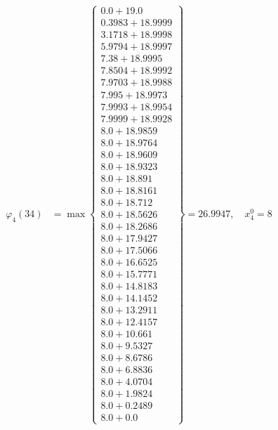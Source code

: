 \documentclass{article}
\begin{document}
\begin{align*}
  
\varphi_{4}(34) &= \max \left\{ \begin{array}{c}
0.0 + 19.0 \\
 0.3983 + 18.9999 \\
 3.1718 + 18.9998 \\
 5.9794 + 18.9997 \\
 7.38 + 18.9995 \\
 7.8504 + 18.9992 \\
 7.9703 + 18.9988 \\
 7.995 + 18.9973 \\
 7.9993 + 18.9954 \\
 7.9999 + 18.9928 \\
 8.0 + 18.9859 \\
 8.0 + 18.9764 \\
 8.0 + 18.9609 \\
 8.0 + 18.9323 \\
 8.0 + 18.891 \\
 8.0 + 18.8161 \\
 8.0 + 18.712 \\
 8.0 + 18.5626 \\
 8.0 + 18.2686 \\
 8.0 + 17.9427 \\
 8.0 + 17.5066 \\
 8.0 + 16.6525 \\
 8.0 + 15.7771 \\
 8.0 + 14.8183 \\
 8.0 + 14.1452 \\
 8.0 + 13.2911 \\
 8.0 + 12.4157 \\
 8.0 + 10.661 \\
 8.0 + 9.5327 \\
 8.0 + 8.6786 \\
 8.0 + 6.8836 \\
 8.0 + 4.0704 \\
 8.0 + 1.9824 \\
 8.0 + 0.2489 \\
 8.0 + 0.0
\end{array} \right\}=26.9947,\quad x_{4}^0=8\\
  
  
  

\end{align*}
\end{document}
